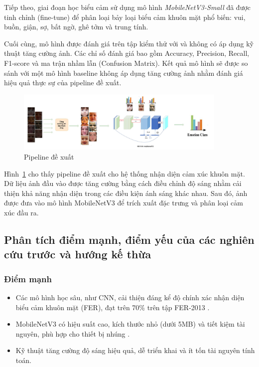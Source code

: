 Tiếp theo, giai đoạn học biểu cảm sử dụng mô hình \textit{MobileNetV3-Small} đã được tinh chỉnh (fine-tune) để phân loại bảy loại biểu cảm khuôn mặt phổ biến: vui, buồn, giận, sợ, bất ngờ, ghê tởm và trung tính.

Cuối cùng, mô hình được đánh giá trên tập kiểm thử với và không có áp dụng kỹ thuật tăng cường ảnh. Các chỉ số đánh giá bao gồm Accuracy, Precision, Recall, F1-score và ma trận nhầm lẫn (Confusion Matrix). Kết quả mô hình sẽ được so sánh với một mô hình baseline không áp dụng tăng cường ảnh nhằm đánh giá hiệu quả thực sự của pipeline đề xuất.


\begin{figure}[H]
    \centering
    \includegraphics[width=0.9\textwidth]{img/pineline.jpg} %
    \caption{Pipeline đề xuất}
    \label{fig:pineline}
\end{figure}

Hình~\ref{fig:pineline} cho thấy pipeline đề xuất cho hệ thống nhận diện cảm xúc khuôn mặt. Dữ liệu ảnh đầu vào được tăng cường bằng cách điều chỉnh độ sáng nhằm cải thiện khả năng nhận diện trong các điều kiện ánh sáng khác nhau. Sau đó, ảnh được đưa vào mô hình MobileNetV3 để trích xuất đặc trưng và phân loại cảm xúc đầu ra.

\subsection{Phân tích điểm mạnh, điểm yếu của các nghiên cứu trước và hướng kế thừa}

\subsubsection{Điểm mạnh}
\begin{itemize}
    \item Các mô hình học sâu, như CNN, cải thiện đáng kể độ chính xác nhận diện biểu cảm khuôn mặt (FER), đạt trên 70\% trên tập FER-2013 \cite{mollahosseini2016}.
    \item MobileNetV3 có hiệu suất cao, kích thước nhỏ (dưới 5MB) và tiết kiệm tài nguyên, phù hợp cho thiết bị nhúng \cite{howard2019, sandler2018}.
    \item Kỹ thuật tăng cường độ sáng hiệu quả, dễ triển khai và ít tốn tài nguyên tính toán.
\end{itemize}

